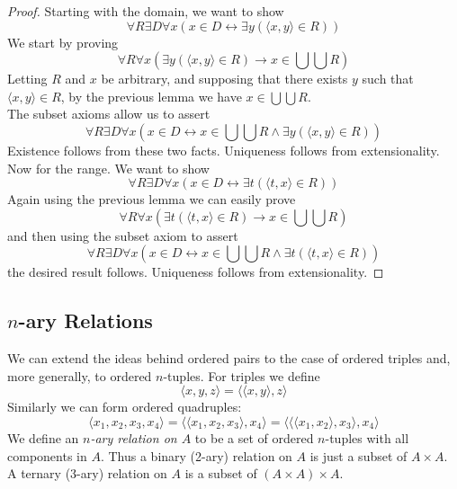 \documentclass{report}
\begin{document}
\begin{proof}
Starting with the domain, we want to show
\begin{equation*}
\forall R\exists D\forall x(x\in D\leftrightarrow\exists y(\langle x,y\rangle\in R))
\end{equation*}
We start by proving
\begin{equation*}
\forall R\forall x(\exists y(\langle x,y\rangle\in R)\to x\in\bigcup\bigcup R)
\end{equation*}
Letting $R$ and $x$ be arbitrary, and supposing that there exists $y$ such that $\langle x,y\rangle\in R$, by the previous lemma we have $x\in\bigcup\bigcup R$.\\
\indent The subset axioms allow us to assert
\begin{equation*}
\forall R\exists D\forall x(x\in D\leftrightarrow x\in\bigcup\bigcup R\land\exists y(\langle x,y\rangle\in R))
\end{equation*}
Existence follows from these two facts. Uniqueness follows from extensionality.\\
\indent Now for the range. We want to show
\begin{equation*}
\forall R\exists D\forall x(x\in D\leftrightarrow\exists t(\langle t,x\rangle\in R))
\end{equation*}
Again using the previous lemma we can easily prove
\begin{equation*}
\forall R\forall x(\exists t(\langle t,x\rangle\in R)\to x\in\bigcup\bigcup R)
\end{equation*}
and then using the subset axiom to assert
\begin{equation*}
\forall R\exists D\forall x(x\in D\leftrightarrow x\in\bigcup\bigcup R\land\exists t(\langle t,x\rangle\in R))
\end{equation*}
the desired result follows. Uniqueness follows from extensionality.
\end{proof}\newpage

\subsection{$n$-ary Relations}
We can extend the ideas behind ordered pairs to the case of ordered triples and, more generally, to ordered $n$-tuples. For triples we define
\begin{equation*}
\langle x,y,z\rangle=\langle\langle x,y\rangle,z\rangle
\end{equation*}
Similarly we can form ordered quadruples:
\begin{equation*}
\langle x_1,x_2,x_3,x_4\rangle=\langle\langle x_1,x_2,x_3\rangle,x_4\rangle=\langle\langle\langle x_1,x_2\rangle,x_3\rangle,x_4\rangle
\end{equation*}
We define an \textit{$n$-ary relation on $A$} to be a set of ordered $n$-tuples with all components in $A$. Thus a binary (2-ary) relation on $A$ is just a subset of $A\times A$. 
A ternary (3-ary) relation on $A$ is a subset of $(A\times A)\times A$.
\end{document}
